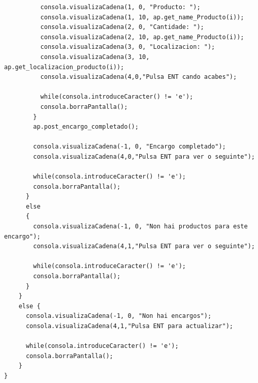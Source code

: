 \documentclass[11pt,twoside]{book}
\begin{document}
\begin{lstlisting}
          consola.visualizaCadena(1, 0, "Producto: ");
          consola.visualizaCadena(1, 10, ap.get_name_Producto(i));
          consola.visualizaCadena(2, 0, "Cantidade: ");
          consola.visualizaCadena(2, 10, ap.get_name_Producto(i));
          consola.visualizaCadena(3, 0, "Localizacion: ");
          consola.visualizaCadena(3, 10, ap.get_localizacion_producto(i));
          consola.visualizaCadena(4,0,"Pulsa ENT cando acabes");

          while(consola.introduceCaracter() != 'e');
          consola.borraPantalla();
        }
        ap.post_encargo_completado();

        consola.visualizaCadena(-1, 0, "Encargo completado");
        consola.visualizaCadena(4,0,"Pulsa ENT para ver o seguinte");

        while(consola.introduceCaracter() != 'e');
        consola.borraPantalla();
      }
      else
      {
        consola.visualizaCadena(-1, 0, "Non hai productos para este encargo");
        consola.visualizaCadena(4,1,"Pulsa ENT para ver o seguinte");

        while(consola.introduceCaracter() != 'e');
        consola.borraPantalla();
      }
    }
    else {
      consola.visualizaCadena(-1, 0, "Non hai encargos");
      consola.visualizaCadena(4,1,"Pulsa ENT para actualizar");

      while(consola.introduceCaracter() != 'e');
      consola.borraPantalla();
    }
}

\end{lstlisting}

\stopcontents[parts]

\cleardoublepage

\renewcommand{\documento}{Pliego de condicións}
\end{document}
